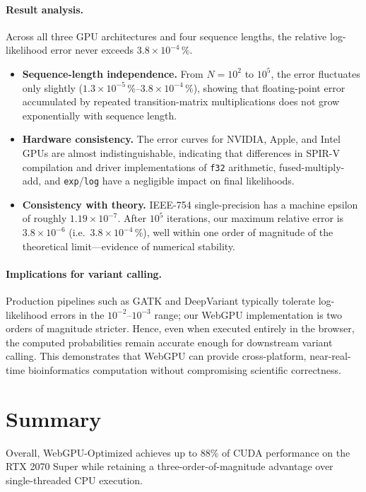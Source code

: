 \documentclass[PhD]{PHlab-thesis}
\begin{document}
\paragraph{Result analysis.}
Across all three GPU architectures and four sequence lengths, the relative log-likelihood error never exceeds $3.8\times10^{-4}\,\%$.
\begin{itemize}
  \item \textbf{Sequence-length independence.} From $N=10^2$ to $10^5$, the error fluctuates only slightly ($1.3\times10^{-5}\,\%$–$3.8\times10^{-4}\,\%$), showing that floating-point error accumulated by repeated transition-matrix multiplications does not grow exponentially with sequence length.
  \item \textbf{Hardware consistency.} The error curves for NVIDIA, Apple, and Intel GPUs are almost indistinguishable, indicating that differences in SPIR-V compilation and driver implementations of \texttt{f32} arithmetic, fused-multiply-add, and \texttt{exp}/\texttt{log} have a negligible impact on final likelihoods.
  \item \textbf{Consistency with theory.} IEEE-754 single-precision has a machine epsilon of roughly $1.19\times10^{-7}$. After $10^5$ iterations, our maximum relative error is $3.8\times10^{-6}$ (i.e.\ $3.8\times10^{-4}\,\%$), well within one order of magnitude of the theoretical limit—evidence of numerical stability.
\end{itemize}

\paragraph{Implications for variant calling.}
Production pipelines such as GATK and DeepVariant typically tolerate log-likelihood errors in the $10^{-2}$–$10^{-3}$ range; our WebGPU implementation is two orders of magnitude stricter. Hence, even when executed entirely in the browser, the computed probabilities remain accurate enough for downstream variant calling. This demonstrates that WebGPU can provide cross-platform, near-real-time bioinformatics computation without compromising scientific correctness.


\section{Summary}
Overall, WebGPU-Optimized achieves up to 88\% of CUDA performance on the RTX 2070 Super while retaining a three-order-of-magnitude advantage over single-threaded CPU execution.
\end{document}
